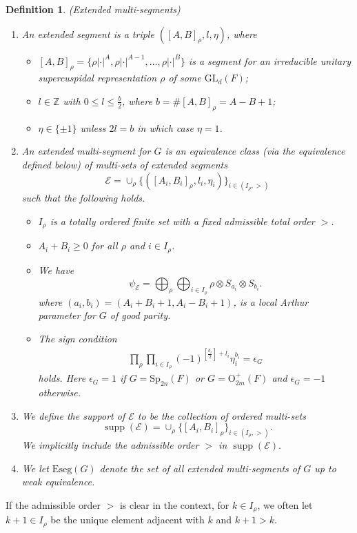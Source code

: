 \documentclass[11pt,letterpaper]{amsart}
\newcommand{\Z}{\mathbb{Z}}
\newcommand{\Eseg}{{\mathrm{Eseg}}}
\newcommand{\GL}{\mathrm{GL}}
\newcommand{\OO}{\mathrm{O}}
\newcommand{\Sp}{\mathrm{Sp}}
\newcommand{\EE}{\mathcal{E}}
\newtheorem{defn}[thm]{Definition}
\DeclareMathOperator{\supp}{supp}
\numberwithin{equation}{section}
\begin{document}
\begin{defn}(Extended multi-segments)\label{def multi-segment}
\begin{enumerate}
\item
An \emph{extended segment} is a triple $([A,B]_\rho, l, \eta)$,
where
\begin{itemize}
\item
$[A,B]_\rho = \{\rho|\cdot|^A, \rho|\cdot|^{A-1}, \dots, \rho|\cdot|^B \}$ is a segment 
for an irreducible unitary supercuspidal representation $\rho$ of some $\GL_d(F)$; 
\item
$l \in \Z$ with $0 \leq l \leq \frac{b}{2}$, where $b = \#[A,B]_\rho = A-B+1$; 
\item
$\eta \in \{\pm1\}$ unless $2l=b$ in which case $\eta=1$. 
\end{itemize}

\item
An \emph{extended multi-segment} for $G$ is 
an equivalence class (via the equivalence defined below) of multi-sets of extended segments 
\[
\EE = \cup_{\rho}\{ ([A_i,B_i]_{\rho}, l_i, \eta_i) \}_{i \in (I_\rho,>)}
\]
such that the following holds.
\begin{itemize}
\item
$I_\rho$ is a totally ordered finite set with a fixed admissible total order $>$.

\item
$A_i + B_i \geq 0$ for all $\rho$ and $i \in I_\rho$.

\item
We have
\[
\psi_{\EE} = \bigoplus_\rho \bigoplus_{i \in I_\rho} \rho \otimes S_{a_i} \otimes S_{b_i}. 
\]
where $(a_i, b_i) = (A_i+B_i+1, A_i-B_i+1)$,
is a local Arthur parameter for $G$ of good parity.
\item The sign condition
\begin{align}\label{eq sign condition}
\prod_{\rho} \prod_{i \in I_\rho} (-1)^{[\frac{b_i}{2}]+l_i} \eta_i^{b_i} = \epsilon_{G}
\end{align}
holds. Here $\epsilon_{G}=1$ if $G=\Sp_{2n}(F)$ or $G=\OO_{2m}^+(F)$ and $\epsilon_{G}=-1$ otherwise.
\end{itemize}


\item
We define the \emph{support} of $\EE$ to be the collection of ordered multi-sets 
\[
\supp(\EE) = \cup_{\rho}\{ [A_i,B_i]_{\rho} \}_{i \in (I_\rho,>)}.
\]
We implicitly include the admissible order $>$ in $\supp(\EE).$
\item We let $\Eseg(G)$ denote the set of all extended multi-segments of $G$ up to weak equivalence.
\end{enumerate}
\end{defn}
If the admissible order $>$ is clear in the context, for $k \in I_{\rho}$, we often let $k+1 \in I_{\rho}$ be the unique element adjacent with $k$ and $k+1>k$.
\end{document}
